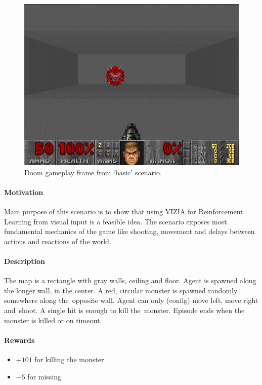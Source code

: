 \documentclass[english,bachelor,a4paper,twoside]{ppfcmthesis}
\begin{document}
		\begin{figure}
			\centering
			\includegraphics[scale=0.46]{basic.png}
			\caption{Doom gameplay frame from `basic' scenario.}\label{fig:basic}
		\end{figure}

		\paragraph{Motivation}
			Main purpose of this scenario is to show that using VIZIA for Reinforcement Learning from visual input is a feasible idea. The scenario exposes most fundamental mechanics of the game like shooting, movement and delays between actions and reactions of the world.
		
		\paragraph{Description}
			The map is a rectangle with gray walls, ceiling and floor. Agent is spawned along the longer wall, in the center. A red, circular monster is spawned randomly somewhere along the~opposite wall. Agent can only (config) move left, move right and~shoot. A single hit is enough to kill the~monster. Episode ends when the monster is killed or on timeout.
		
		\paragraph{Rewards}
			\begin{itemize}
				\item $+101$ for killing the monster
				\item $-5$ for missing
			\end{itemize}
		
\end{document}
